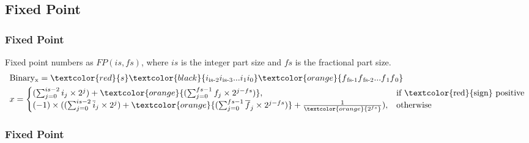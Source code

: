 \subsection{Fixed Point}
\begin{frame}
    \frametitle{Fixed Point}
    Fixed point numbers as $FP(is, fs)$, where $is$ is the integer part size and $fs$ is the fractional part size.
    \begin{equation}
        \begin{aligned}
            &\text{Binary}\textsubscript{x}=\textcolor{red}{s}\textcolor{black}{i\textsubscript{is-2}i\textsubscript{is-3}...i\textsubscript{1}i\textsubscript{0}}\textcolor{orange}{f\textsubscript{fs-1}f\textsubscript{fs-2}...f\textsubscript{1}f\textsubscript{0}}\\
            &x=\begin{cases}
                    (\sum_{j=0}^{is-2} i_j \times 2^j) + \textcolor{orange}{(\sum_{j=0}^{fs-1} f_j \times 2^{j-fs})},& \text{if \textcolor{red}{sign} positive} \\
                    (-1) \times ((\sum_{j=0}^{is-2} \overline{i}_j \times 2^j) + \textcolor{orange}{(\sum_{j=0}^{fs-1} \overline{f}_j \times 2^{j-fs})} + \frac{1}{ \textcolor{orange}{2^{fs}}}), & \text{otherwise}
            \end{cases}
        \end{aligned}
    \end{equation}
\end{frame}


\begin{frame}
    \frametitle{Fixed Point}
\end{frame}

